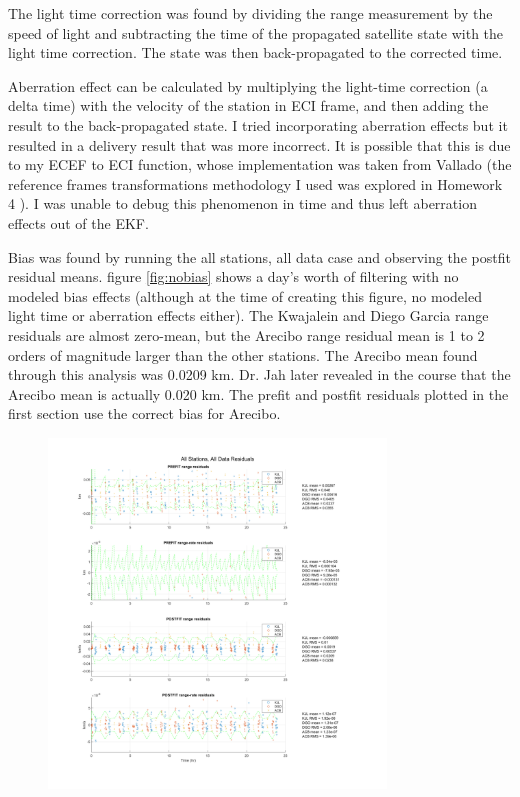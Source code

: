 \documentclass[conf]{new-aiaa}
\begin{document}
The light time correction was found by dividing the range measurement by the speed of light and subtracting the time of the propagated satellite state with the light time correction. The state was then back-propagated to the corrected time. 

Aberration effect can be calculated by multiplying the light-time correction (a delta time) with the velocity of the station in ECI frame, and then adding the result to the back-propagated state. I tried incorporating aberration effects but it resulted in a delivery result that was more incorrect. It is possible that this is due to my ECEF to ECI function, whose implementation was taken from Vallado (the reference frames transformations methodology I used was explored in  Homework 4 \cite{HW4}). I was unable to debug this phenomenon in time and thus left aberration effects out of the EKF. 

Bias was found by running the all stations, all data case and observing the postfit residual means. figure \ref{fig:nobias} shows a day's worth of filtering with no modeled bias effects (although at the time of creating this figure, no modeled light time or aberration effects either). The Kwajalein and Diego Garcia range residuals are almost zero-mean, but the Arecibo range residual mean is 1 to 2 orders of magnitude larger than the other stations. The Arecibo mean found through this analysis was 0.0209 km. Dr. Jah later revealed in the course that the Arecibo mean is actually 0.020 km. The prefit and postfit residuals plotted in the first section use the correct bias for Arecibo. 

\begin{figure}[H]
	\centering
	\includegraphics[width=0.8\textwidth]{allsta_alldata_nobias.png}
\end{figure}
\label{fig:nobias}
\end{document}
